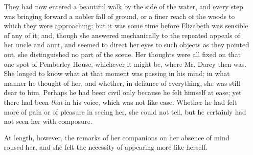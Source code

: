 \documentclass[12pt,openright]{book}
\begin{document}
They had now entered a beautiful walk by the side of the water, and every step was bringing forward a nobler fall of ground, or a finer reach of the woods to which they were approaching: but it was some time before Elizabeth was sensible of any of it; and, though she answered mechanically to the repeated appeals of her uncle and aunt, and seemed to direct her eyes to such objects as they pointed out, she distinguished no part of the scene. Her thoughts were all fixed on that one spot of Pemberley House, whichever it might be, where Mr. Darcy then was. She longed to know what at that moment was passing in his mind; in what manner he thought of her, and whether, in defiance of everything, she was still dear to him. Perhaps he had been civil only because he felt himself at ease; yet there had been \textit{that} in his voice, which was not like ease. Whether he had felt more of pain or of pleasure in seeing her, she could not tell, but he certainly had not seen her with composure.

At length, however, the remarks of her companions on her absence of mind roused her, and she felt the necessity of appearing more like herself.
\end{document}

